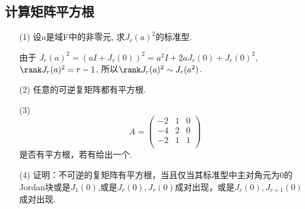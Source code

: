 \subsection{计算矩阵平方根}
    \begin{itemize}
        \item[(1)] 设$a$是域F中的非零元, 求$J_r(a)^2$的标准型.
        \begin{solution}
            由于
            $J_r(a)^2 = (aI + J_r(0))^2
                      = a^2 I + 2aJ_r(0) + J_r(0)^2$,
            $\rank J_r(a)^2 = r-1$, 所以$\rank J_r(a)^2 \sim J_r(a^2)$.
        \end{solution}
        \vspace{3cm}
        \item[(2)] 任意的可逆复矩阵都有平方根.
        \vspace{3cm}
        \item[(3)]
        \begin{equation}
        \nonumber
            A = 
            \begin{pmatrix}
               -2& 1& 0\\
               -4& 2& 0\\
               -2& 1& 1\\
            \end{pmatrix}
        \end{equation} 
        是否有平方根，若有给出一个.
        \vspace{3cm}
        \item[(4)] 证明：不可逆的复矩阵有平方根，当且仅当其标准型中主对角元为0的
        Jordan块或是$J_1(0)$,或是$J_r(0), J_{r}(0)$成对出现，或是$J_r(0), J_{r+1}(0)$成对出现. 
        \vspace{3cm}
    \end{itemize}